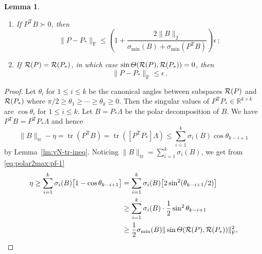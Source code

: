 \documentclass[11pt]{article}
\def\bbR{\mathbb{R}}
\def\cR{{\cal R}}
\newcommand\STM[2]{{\rm St}(#1,#2)}
\DeclareMathOperator{\tr}{tr}
\DeclareMathOperator{\F}{F}
\DeclareMathOperator{\T}{T}
\newtheorem{lemma}{Lemma}[section]
\theoremstyle{definition}
\numberwithin{equation}{section}
\begin{document}
\begin{lemma}
\begin{enumerate}[{\rm (a)}]
  \item If  $P^{\T}B\succ 0$, then
        \begin{equation} \label{eq:polar2max-2}
         \|P-P_*\|_{\F}\le\left(1+\frac {2\|B\|_2}{\sigma_{\min}(B)+\sigma_{\min}(P^{\T}B)}\right)
                             {\epsilon}\,;
        \end{equation}
  \item  If  $\cR(P)=\cR(P_*)$, in which case $\sin\Theta(\cR(P),\cR(P_*))=0$, then
        \begin{equation} \label{eq:polar2max-3}
         \|P-P_*\|_{\F}\le {\epsilon}\,.
        \end{equation}
\end{enumerate}
\end{lemma}

\begin{proof}
Let $\theta_i$ for $1\le i\le k$ be the canonical angles between
subspaces $\cR(P)$ and $\cR(P_*)$ where $\pi/2\ge\theta_1\ge\cdots\ge\theta_k\ge 0$.
Then the singular values of $P^{\T}P_*\in\bbR^{k\times k}$ are $\cos\theta_i$ for $1\le i\le k$. Let $B=P_*\Lambda$ be the polar decomposition of $B$.
We have
$P^{\T}B=P^{\T}P_*\Lambda$ and hence
\begin{equation}\label{eq:polar2max:pf-1}
\|B\|_{\tr}-\eta=\tr(P^{\T}B)=\tr([P^{\T}P_*]\Lambda)\le\sum_{i=1}^k\sigma_i(B)\cos\theta_{k-i+1}
\end{equation}
by Lemma~\ref{lm:vN-tr-ineq}.
Noticing $\|B\|_{\tr}=\sum_{i=1}^k\sigma_i(B)$, we get from \eqref{eq:polar2max:pf-1}
\begin{align}
\eta\ge\sum_{i=1}^k\sigma_i(B)\big[1-\cos\theta_{k-i+1}\big]&=\sum_{i=1}^k\sigma_i(B)\big[2\sin^2(\theta_{k-i+1}/2)\big]
       \label{eq:polar2max:pf-2}\\
  &\ge\sum_{i=1}^k\sigma_i(B)\cdot\frac 12\sin^2\theta_{k-i+1} \label{eq:polar2max:pf-3}\\
  &\ge\frac 12\sigma_{\min}(B)\|\sin\Theta(\cR(P),\cR(P_*))\|_{\F}^2, \nonumber
\end{align}

\end{proof}
\end{document}
